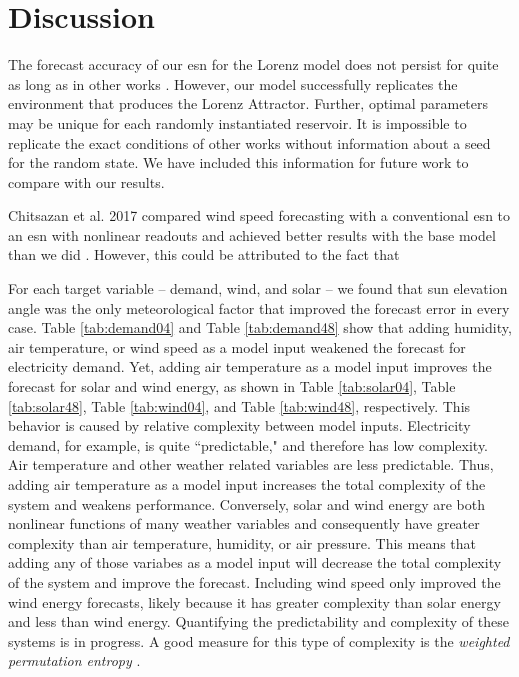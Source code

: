 \section{Discussion}

The forecast accuracy of our \gls{esn} for the Lorenz model does not persist
for quite as long as in other works \cite{pathak_using_2017}. However, our
model successfully replicates the environment that produces the Lorenz
Attractor. Further, optimal parameters may be unique for each randomly
instantiated reservoir. It is impossible to replicate the exact conditions of
other works without information about a seed for the random state. We have
included this information for future work to compare with our results.

Chitsazan et al. 2017 compared wind speed forecasting with a conventional
\gls{esn} to an \gls{esn} with nonlinear readouts and achieved better results
with the base model than we did \cite{chitsazan_wind_2017}. However, this could be attributed to the fact that

For each target variable -- demand, wind, and solar -- we found that sun
elevation angle was the only meteorological factor that improved the forecast
error in every case. Table \ref{tab:demand04} and
Table \ref{tab:demand48} show that adding humidity, air temperature, or wind
speed as a model input weakened the forecast for electricity demand. Yet,
adding air temperature as a model input improves the forecast for solar and
wind energy, as shown in Table
\ref{tab:solar04}, Table \ref{tab:solar48}, Table \ref{tab:wind04}, and Table
\ref{tab:wind48}, respectively. This behavior is caused by relative complexity
between model inputs. Electricity demand, for example, is quite ``predictable,"
and therefore has low complexity. Air temperature and other weather related
variables are less predictable. Thus, adding air temperature as a model input
increases the total complexity of the system and weakens performance.
 Conversely, solar and wind energy are both nonlinear functions of many weather
 variables and consequently have greater complexity than air temperature,
 humidity, or air pressure. This means that adding any of those variabes as a
 model input will decrease the total complexity of the system and improve the
 forecast. Including wind speed only improved the wind energy forecasts, likely
 because it has greater complexity than solar energy and less than wind energy.
 Quantifying the predictability and complexity of these systems is in progress.
 A good measure for this type of complexity is the \textit{weighted permutation entropy}
 \cite{fadlallah_weighted-permutation_2013,garland_model-free_2014, pennekamp_intrinsic_2019}.


